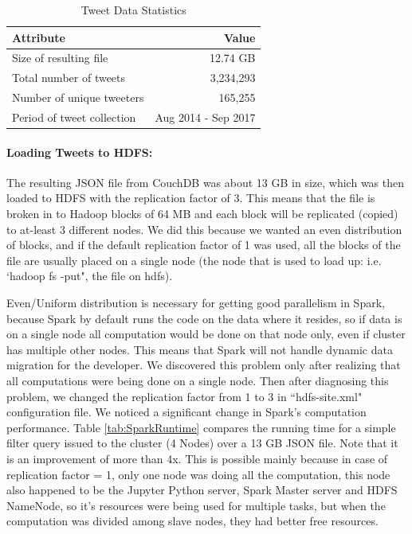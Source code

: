 \documentclass[12pt]{report}
\theoremstyle{named}
\begin{document}
\begin{table}[ht]
\centering
\begin{tabular}{@{}lr@{}}
\toprule
\textbf{Attribute}          & \textbf{Value}      \\ \midrule
Size of resulting file     & 12.74 GB            \\
Total number of tweets     & 3,234,293             \\
Number of unique tweeters  & 165,255              \\
Period of tweet collection & Aug 2014 - Sep 2017 \\ \bottomrule
\end{tabular}
\caption{Tweet Data Statistics}
\label{tab:tweetdata}
\end{table}
\paragraph{Loading Tweets to HDFS:\\}
The resulting JSON file from CouchDB was about 13 GB in size, which was then loaded to HDFS with the replication factor of 3. This means that the file is broken in to Hadoop blocks of 64 MB and each block will be replicated (copied) to at-least 3 different nodes. We did this because we wanted an even distribution of blocks, and if the default replication factor of 1 was used, all the blocks of the file are usually placed on a single node (the node that is used to load up: i.e. `hadoop fs -put", the file on hdfs).

Even/Uniform distribution is necessary for getting good parallelism in Spark, because Spark by default runs the code on the data where it resides, so if data is on a single node all computation would be done on that node only, even if cluster has multiple other nodes. This means that Spark will not handle dynamic data migration for the developer. We discovered this problem only after realizing that all computations were being done on a single node. Then after diagnosing this problem, we changed the replication factor from 1 to 3 in ``hdfs-site.xml" configuration file. We noticed a significant change in Spark's computation performance. Table \ref{tab:SparkRuntime} compares the running time for a simple filter query issued to the cluster (4 Nodes) over a 13 GB JSON file. Note that it is an improvement of more than 4x. This is possible mainly because in case of replication factor = 1, only one node was doing all the computation, this node also happened to be the Jupyter Python server, Spark Master server and HDFS NameNode, so it's resources were being used for multiple tasks, but when the computation was divided among slave nodes, they had better free resources.
\end{document}
